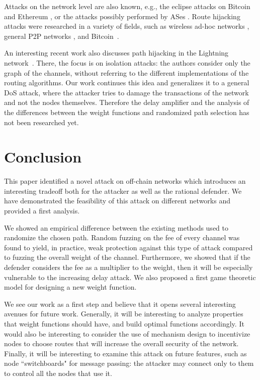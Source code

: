 Attacks on the network level are also known, e.g.,
the eclipse attacks on Bitcoin \cite{heilman2015eclipse} and Ethereum \cite{marcus2018low}, 
or the attacks possibly performed by ASes \cite{apostolaki2016hijacking}. 
Route hijacking attacks were researched in a variety of fields, such as wireless ad-hoc networks \cite{deng2002routing}, general P2P networks \cite{naoumov2006exploiting}, and Bitcoin~\cite{apostolaki2017hijacking}.

An interesting recent work also discusses 
path hijacking in the Lightning network~\cite{rohrer2019discharged}.
There, the focus is on isolation attacks: 
the authors consider only the graph of the channels, without referring to the different implementations of the routing algorithms. Our work continues this idea and generalizes it to a general DoS
attack, where the attacker tries to damage the transactions of the network and not the nodes themselves. Therefore the delay amplifier and the analysis of the differences between the weight functions and 
randomized path selection has not been researched yet.

\section{Conclusion}\label{sec:conclusion}

This paper identified a novel attack on off-chain networks 
which introduces an interesting tradeoff both for the attacker 
as well as the rational defender. We have demonstrated the feasibility of this
attack on different networks and provided a first analysis.

We showed an empirical difference between the existing methods used
to randomize the chosen path. Random fuzzing on the fee of every channel was found to yield, in practice, weak protection against this type of attack compared to fuzzing the overall weight of the channel. Furthermore, we showed that if the defender considers the fee as a multiplier to the weight, then it will be especially vulnerable to the increasing delay attack.
We also proposed a first game theoretic model
for designing a new weight function.

We see our work as a first step and believe that it opens several interesting
avenues for future work. Generally, it will be interesting to analyze properties that weight functions should have, and build optimal functions accordingly.
It would also be interesting to consider the use of mechanism design
to incentivize nodes to choose routes that will increase the overall security of the network. 
Finally, it will be interesting to examine this attack on future features,
such as node ``switchboards" for message passing: the attacker may connect only to them to  control all the nodes that use it.

\balance

